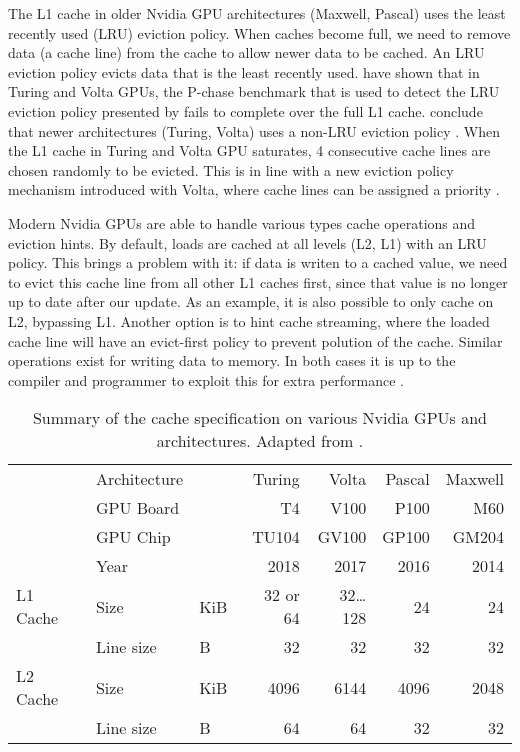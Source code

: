 The L1 cache in older Nvidia GPU architectures (Maxwell, Pascal) uses the least recently used (LRU) eviction policy.
When caches become full, we need to remove data (a cache line) from the cache to allow newer data to be cached.
An LRU eviction policy evicts data that is the least recently used.
\citet{jia2019dissecting} have shown that in Turing and Volta GPUs, the P-chase benchmark that is used to detect the LRU eviction policy presented by \citet{mei2016dissecting} fails to complete over the full L1 cache.
\citeauthor{jia2019dissecting} conclude that newer architectures (Turing, Volta) uses a non-LRU eviction policy \cite{jia2019dissecting, jia2018dissecting,mei2016dissecting}.
When the L1 cache in Turing and Volta GPU saturates, 4 consecutive cache lines are chosen randomly to be evicted.
This is in line with a new eviction policy mechanism introduced with Volta, where cache lines can be assigned a priority \cite{jia2019dissecting,nvidia2021cudadocs}.

Modern Nvidia GPUs are able to handle various types cache operations and eviction hints.
By default, loads are cached at all levels (L2, L1) with an LRU policy.
This brings a problem with it: if data is writen to a cached value, we need to evict this cache line from all other L1 caches first, since that value is no longer up to date after our update.
As an example, it is also possible to only cache on L2, bypassing L1.
Another option is to hint cache streaming, where the loaded cache line will have an evict-first policy to prevent polution of the cache.
Similar operations exist for writing data to memory.
In both cases it is up to the compiler and programmer to exploit this for extra performance \cite{nvidia2021cudadocs}.


\begin{table}
    \centering
    \begin{tabular}{l l l|r r r r}
        & Architecture & &    Turing &      Volta & Pascal & Maxwell
        \\
        & GPU Board    & &        T4 &       V100 &   P100 &     M60
        \\
        & GPU Chip     & &     TU104 &      GV100 &  GP100 &   GM204
        \\
        & Year         & &      2018 &       2017 &   2016 &    2014
        \\
        \hline
        L1 Cache%
        & Size     & KiB &  32 or 64 & 32\dots128 &     24 &      24
        \\
        & Line size  & B &        32 &         32 &     32 &      32
        \\
        \hline
        L2 Cache%
        & Size     & KiB &      4096 &      6144 &   4096 &    2048
        \\
        & Line size  & B &        64 &        64 &     32 &      32
        \\
    \end{tabular}
    \caption{
        Summary of the cache specification on various Nvidia GPUs and architectures. 
        Adapted from \citeauthor{jia2019dissecting}\cite{jia2019dissecting}.
    }
\end{table}

